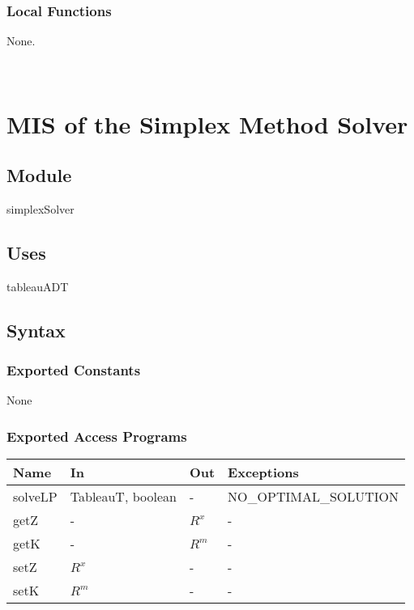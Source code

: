 \documentclass[12pt, titlepage]{article}
\begin{document}
\subsubsection{Local Functions}

None.

~\newpage

\section{MIS of the Simplex Method Solver} \label{M_simplexSolver} 

\subsection{Module}

simplexSolver

\subsection{Uses}

tableauADT

\subsection{Syntax}

\subsubsection{Exported Constants}

None

\subsubsection{Exported Access Programs}

\begin{center}
	\begin{tabular}{p{2cm} p{4cm} p{3cm} p{5cm}}
		\hline
		\textbf{Name} & \textbf{In} & \textbf{Out} & \textbf{Exceptions} \\
		\hline
		solveLP & TableauT, boolean & - & NO\_OPTIMAL\_SOLUTION \\
		getZ & - & $R^x$ & - \\
		getK & - & $R^m$ & - \\
		setZ & $R^x$ & - & - \\
		setK & $R^m$ & - & - \\
		\hline
	\end{tabular}
\end{center}
\end{document}

